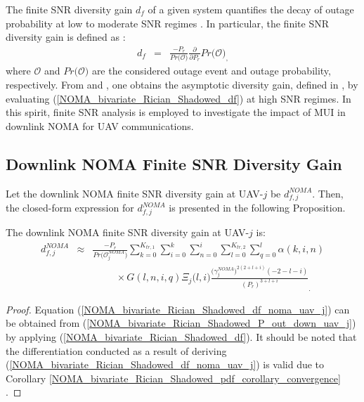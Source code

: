The finite SNR diversity gain $d_f$ of a given system quantifies the decay of outage probability at low to moderate SNR regimes \cite{narasimhan2006finite,shin2008diversity}. In particular, the finite SNR diversity gain is defined as \cite[eq. (5)]{narasimhan2006finite}:
\begin{eqnarray} \label{NOMA_bivariate_Rician_Shadowed_df}
d_f & = & \frac{-P_r}{Pr\big(\mathcal{O}\big)}\frac{\partial}{\partial P_r}Pr\big(\mathcal{O}\big)_,
\end{eqnarray}
where $\mathcal{O}$ and $Pr\big(\mathcal{O}\big)$ are the considered outage event and outage probability, respectively. From \cite{shin2008diversity} and \cite{heidarpour2017finite}, one obtains the asymptotic diversity gain, defined in \cite{zheng2003diversity}, by evaluating (\ref{NOMA_bivariate_Rician_Shadowed_df}) at high SNR regimes. In this spirit, finite SNR analysis is employed to investigate the impact of MUI in downlink NOMA for UAV communications.

\subsection{Downlink NOMA Finite SNR Diversity Gain}

Let the downlink NOMA finite SNR diversity gain at UAV-$j$ be $d_{f,j}^{NOMA}$. Then, the closed-form expression for $d_{f,j}^{NOMA}$ is presented in the following Proposition.

\begin{proposition} \label{NOMA_bivariate_Rician_Shadowed_proposition_df_noma_uav_j}
The downlink NOMA finite SNR diversity gain at UAV-$j$ is:
\begin{eqnarray}
d_{f,j}^{NOMA} & \approx & \frac{-P_r}{Pr\big(\mathcal{O}_{j}^{NOMA}\big)} \sum_{k=0}^{K_{tr,1}} \sum_{i=0}^{k} \sum_{n=0}^{i} \sum_{l=0}^{K_{tr,2}} \sum_{q=0}^{l} \alpha(k,i,n) \nonumber \\
 & & \hspace{1cm} \times G(l,n,i,q) \Xi_j\big(l,i\big) \frac{\big(\gamma_j^{NOMA}\big)^{2(2+l+i)} (-2-l-i)}{(P_r)^{3+l+i}}_. \label{NOMA_bivariate_Rician_Shadowed_df_noma_uav_j}
\end{eqnarray}
\end{proposition}
\begin{proof}
Equation (\ref{NOMA_bivariate_Rician_Shadowed_df_noma_uav_j}) can be obtained from (\ref{NOMA_bivariate_Rician_Shadowed_P_out_down_uav_j}) by applying (\ref{NOMA_bivariate_Rician_Shadowed_df}). It should be noted that the differentiation conducted as a result of deriving (\ref{NOMA_bivariate_Rician_Shadowed_df_noma_uav_j}) is valid due to Corollary \ref{NOMA_bivariate_Rician_Shadowed_pdf_corollary_convergence} \cite{amann2005analysis,gradshteyn2014table}.
\end{proof}

